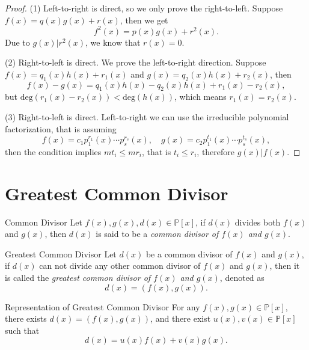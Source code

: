 \begin{proof}
  (1) Left-to-right is direct, so we only prove the right-to-left.
  Suppose $f(x) = q(x)g(x) + r(x)$, then we get
  \begin{equation}
    f^2(x) = p(x)g(x) + r^2(x).
  \end{equation}
  Due to $g(x) | r^2(x)$, we know that $r(x) = 0$.

  (2) Right-to-left is direct. We prove the left-to-right direction.
  Suppose $f(x) = q_1(x)h(x)+r_1(x)$ and $g(x) = q_2(x)h(x) + r_2(x)$,
  then
  \begin{equation}
    f(x) - g(x) = q_1(x)h(x) - q_2(x)h(x) + r_1(x) - r_2(x),
  \end{equation}
  but $\mathrm{deg}(r_1(x) - r_2(x)) < \mathrm{deg}(h(x))$,
  which means $r_1(x) = r_2(x)$.

  (3) Right-to-left is direct. Left-to-right we can use the irreducible
  polynomial factorization, that is assuming
  \begin{equation}
    f(x) = c_1p_1^{r_1}(x) \cdots p_s^{r_s}(x), \quad
    g(x) = c_2p_1^{t_1}(x) \cdots p_s^{t_s}(x),
  \end{equation}
  then the condition implies $mt_i \leq mr_i$,
  that is $t_i \leq r_i$, therefore $g(x)|f(x)$.
\end{proof}

\section{Greatest Common Divisor}

\begin{definition}{Common Divisor}{}
  Let $f(x), g(x), d(x) \in \mathbb{P}[x]$,
  if $d(x)$ divides both $f(x)$ and $g(x)$,
  then $d(x)$ is said to be a \emph{common divisor of $f(x)$ and $g(x)$}.
\end{definition}

\begin{definition}{Greatest Common Divisor}{}
  Let $d(x)$ be a common divisor of $f(x)$ and $g(x)$,
  if $d(x)$ can not divide any other common divisor of $f(x)$ and $g(x)$,
  then it is called the \emph{greatest common divisor of $f(x)$ and $g(x)$},
  denoted as
  \begin{equation}
    d(x) = \left( f(x), g(x) \right).
  \end{equation}
\end{definition}

\begin{theorem}{Representation of Greatest Common Divisor}{}
  For any $f(x), g(x) \in \mathbb{P}[x]$,
  there exists $d(x) = (f(x), g(x))$, and there exist $u(x), v(x) \in \mathbb{P}[x]$
  such that
  \begin{equation}
    d(x) = u(x) f(x) + v(x) g(x).
  \end{equation}
\end{theorem}

